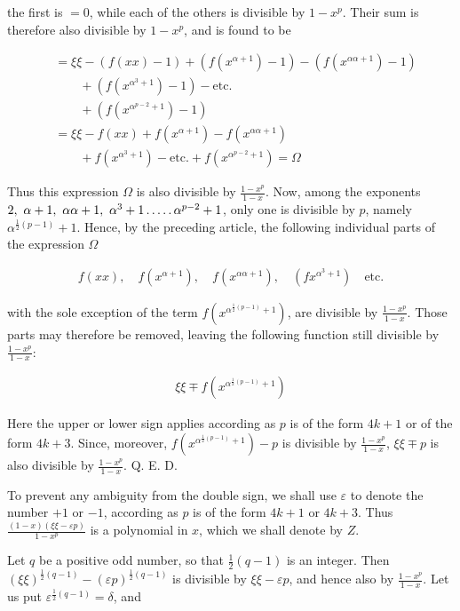 the first is $=0$, while each of the others is divisible by $1-x^p$. Their sum is therefore also divisible by $1-x^p$, and is found to be

\[
\begin{aligned}
&=\xi\xi-(f(xx)-1)+(f(x^{\alpha+1})-1)-(f(x^{\alpha\alpha+1})-1)\\&\qquad+(f(x^{\alpha^3+1})-1)-\text{etc.}\\
&\qquad+(f(x^{\alpha^{p-2}+1})-1)\\
&=\xi\xi-f(xx)+f(x^{\alpha+1})-f(x^{\alpha\alpha+1})\\&\qquad+f(x^{\alpha^3+1})-\text{etc.}+f(x^{\alpha^{p-2}+1})=\Omega
\end{aligned}
\]

Thus this expression $\Omega$ is also divisible by $\frac{1-x^p}{1-x}$. Now, among the exponents $2,\ \alpha+1,\ \alpha\alpha+1,\ \alpha^3+1\dotsfive\alpha^{p-2}+1$, only one is divisible by $p$, namely $\alpha^{\frac12(p-1)}+1$. Hence, by the preceding article, the following individual parts of the expression $\Omega$

\[
\begin{aligned}
f(xx),\quad f(x^{\alpha+1}),\quad f(x^{\alpha\alpha+1}),\quad (fx^{\alpha^3+1})\quad\text{etc.}
\end{aligned}
\]

with the sole exception of the term $f(x^{\alpha^{\frac12(p-1)}+1})$, are divisible by $\frac{1-x^p}{1-x}$. Those parts may therefore be removed, leaving the following function still divisible by $\frac{1-x^p}{1-x}$:

\[
\begin{aligned}
\xi\xi\mp f(x^{\alpha^{\frac12(p-1)}+1})
\end{aligned}
\]

 Here the upper or lower sign applies according as $p$ is of the form $4k+1$ or of the form $4k+3$. Since, moreover, $f(x^{\alpha^{\frac12(p-1)}+1})-p$ is divisible by $\frac{1-x^p}{1-x}$, $\xi\xi\mp p$ is also divisible by $\frac{1-x^p}{1-x}$. Q. E. D.

To prevent any ambiguity from the double sign, we shall use $\varepsilon$ to denote the number $+1$ or $-1$, according as $p$ is of the form $4k+1$ or $4k+3$. Thus $\frac{(1-x)(\xi\xi-\varepsilon p)}{1-x^p}$ is a polynomial in $x$, which we shall denote by $Z$.


Let $q$ be a positive odd number, so that $\frac12(q-1)$ is an integer. Then $(\xi\xi)^{\frac12(q-1)}-(\varepsilon p)^{\frac12(q-1)}$ is divisible by $\xi\xi-\varepsilon p$, and hence also by $\frac{1-x^p}{1-x}$. Let us put $\varepsilon^{\frac12(q-1)}=\delta$, and

